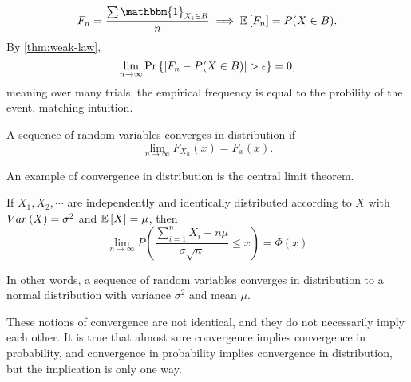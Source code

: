 \[
  F_n = \frac{\sum\mathbbm{1}_{X_i\in B}}{n} \implies \expect{F_n} = P(X \in B).
\]
By \cref{thm:weak-law}, \[
  \lim_{n\to\infty}\text{Pr}\left\{|F_n - P(X\in B)| > \epsilon\right\} = 0,
\]
meaning over many trials, the empirical frequency is equal to the probility of the event, matching intuition.
\begin{definition}
	A sequence of random variables converges in distribution if \[
		\lim_{n\to\infty}F_{X_n}(x) = F_x(x).
	\]
	\label{defn:converge-dist}
\end{definition}
An example of convergence in distribution is the central limit theorem.
\begin{theorem}
	If $X_1, X_2, \cdots$ are independently and identically distributed according to $X$ with $Var\left(X\right) = \sigma^2$ and $\mathbb{E}\left[X\right] = \mu$, then
	\[
		\lim_{n\to\infty}P\left(\frac{\sum_{i=1}^nX_i - n\mu}{\sigma\sqrt{n}} \leq x\right) = \Phi(x)
	\]
	\label{thm:central-limit}
\end{theorem}
In other words, a sequence of random variables converges in distribution to a normal distribution with variance $\sigma^2$ and mean $\mu$.

These notions of convergence are not identical, and they do not necessarily imply each other.
It is true that almost sure convergence implies convergence in probability, and convergence in probability implies convergence in distribution, but the implication is only one way.




